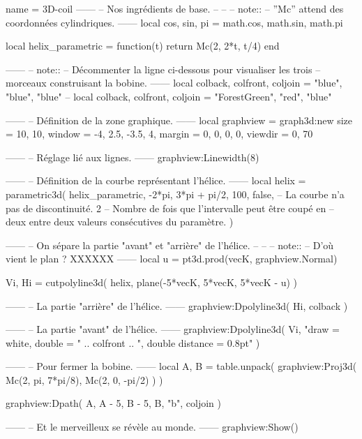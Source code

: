 \documentclass[varwidth]{standalone}
\begin{document}
\begin{luadraw}{name = 3D-coil}
------
-- Nos ingrédients de base.
--
--
-- note::
--     ''Mc'' attend des coordonnées cylindriques.
------
local cos, sin, pi = math.cos, math.sin, math.pi

local helix_parametric = function(t)
  return Mc(2, 2*t, t/4)
end

------
-- note::
--     Décommenter la ligne ci-dessous pour visualiser les trois
--     morceaux construisant la bobine.
------
local colback, colfront, coljoin = "blue", "blue", "blue"
-- local colback, colfront, coljoin = "ForestGreen", "red", "blue"

------
-- Définition de la zone graphique.
------
local graphview = graph3d:new{
  size    = {10, 10},
  window  = {-4, 2.5, -3.5, 4},
  margin  = {0, 0, 0, 0},
  viewdir = {0, 70}
}

------
-- Réglage lié aux lignes.
------
graphview:Linewidth(8)

------
-- Définition de la courbe représentant l'hélice.
------
local helix = parametric3d(
  helix_parametric,
  -2*pi, 3*pi + pi/2,
  100,
  false,  -- La courbe n'a pas de discontinuité.
  2       -- Nombre de fois que l’intervalle peut être coupé en
          -- deux entre deux valeurs consécutives du paramètre.
)

------
-- On sépare la partie "avant" et "arrière" de l'hélice.
--
--
-- note::
--     D'où vient le plan ?   XXXXXX
------
local u = pt3d.prod(vecK, graphview.Normal)

Vi, Hi = cutpolyline3d(
  helix,
  plane(-5*vecK, 5*vecK, 5*vecK - u)
)

------
-- La partie "arrière" de l'hélice.
------
graphview:Dpolyline3d(
  Hi,
  colback
)

------
-- La partie "avant" de l'hélice.
------
graphview:Dpolyline3d(
  Vi,
     "draw = white, double = "
  .. colfront
  .. ", double distance = 0.8pt"
)

------
-- Pour fermer la bobine.
------
local A, B = table.unpack(
  graphview:Proj3d({
    Mc(2, pi, 7*pi/8),
    Mc(2, 0, -pi/2)
  })
)

graphview:Dpath(
  {A, A - 5, B - 5, B, "b"},
  coljoin
)

------
-- Et le merveilleux se révèle au monde.
------
graphview:Show()
\end{luadraw}
\end{document}
